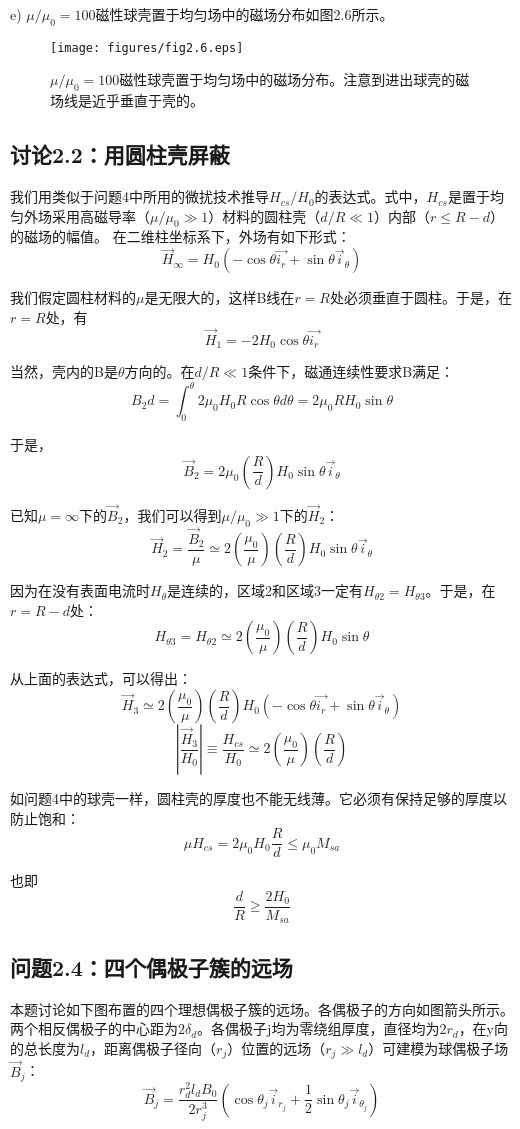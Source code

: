 e) $\mu/\mu_0=100$磁性球壳置于均匀场中的磁场分布如图2.6所示。

\begin{figure}
  \centering
 \texttt{[image: figures/fig2.6.eps]}
  \caption{$\mu/\mu_0=100$磁性球壳置于均匀场中的磁场分布。注意到进出球壳的磁场线是近乎垂直于壳的。}
\end{figure}

\subsection{讨论2.2：用圆柱壳屏蔽}
我们用类似于问题4中所用的微扰技术推导$H_{cs}/H_0$的表达式。式中，$H_{cs}$是置于均匀外场采用高磁导率（$\mu/\mu_0 \gg 1$）材料的圆柱壳（$d/R\ll 1$）内部（$r\le R-d$）的磁场的幅值。
在二维柱坐标系下，外场有如下形式：
$$
\vec{H}_\infty =H_0 (-\cos\theta \vec{i_r}+\sin\theta\vec{i}_\theta)
$$

我们假定圆柱材料的$\mu$是无限大的，这样B线在$r=R$处必须垂直于圆柱。于是，在$r=R$处，有
$$\vec{H}_1 =-2 H_0 \cos\theta \vec{i_r}$$

当然，壳内的B是$\theta$方向的。在$d/R\ll 1$条件下，磁通连续性要求B满足：
$$B_2 d=\int_{0}^{\theta}2\mu_0 H_0 R\cos\theta d\theta=2\mu_0 R H_0 \sin\theta$$

于是，
$$\vec{B}_2=2\mu_0 (\frac{R}{d})H_0 \sin\theta \vec{i}_\theta$$

已知$\mu=\infty$下的$\vec{B}_2$，我们可以得到$\mu/\mu_0 \gg 1$下的$\vec{H}_2$：
$$\vec{H}_2= \frac{\vec{B}_2}{\mu}\simeq 2(\frac{\mu_0}{\mu}) (\frac{R}{d})H_0 \sin\theta \vec{i}_\theta$$

因为在没有表面电流时$H_\theta$是连续的，区域2和区域3一定有$H_{\theta 2}=H_{\theta 3}$。于是，在$r=R-d$处：
$$H_{\theta 3}=H_{\theta 2}\simeq 2(\frac{\mu_0}{\mu}) (\frac{R}{d})H_0 \sin\theta$$

从上面的表达式，可以得出：
$$\vec{H}_3 \simeq 2(\frac{\mu_0}{\mu}) (\frac{R}{d})H_0 (-\cos\theta \vec{i_r}+\sin\theta\vec{i}_\theta)$$
$$\left|\frac{\vec{H}_3}{H_0}\right|\equiv\frac{H_{cs}}{H_0}\simeq 2(\frac{\mu_0}{\mu}) (\frac{R}{d})$$

如问题4中的球壳一样，圆柱壳的厚度也不能无线薄。它必须有保持足够的厚度以防止饱和：
$$\mu H_{cs}=2\mu_0 H_0 \frac{R}{d}\le \mu_0 M_{sa}$$

也即
$$\frac{d}{R}\ge \frac{2H_0}{M_{sa}}$$


\subsection{问题2.4：四个偶极子簇的远场}
本题讨论如下图布置的四个理想偶极子簇的远场。各偶极子的方向如图箭头所示。两个相反偶极子的中心距为$2\delta_d$。各偶极子j均为零绕组厚度，直径均为$2r_d$，在y向的总长度为$l_d$，距离偶极子径向（$r_j$）位置的远场（$r_j \gg l_d$）可建模为球偶极子场$\vec{B}_j$：
$$\vec{B}_j=\frac{r_d^2 l_d B_0}{2r_j^3}(\cos\theta_j \vec{i}_{r_j}+\frac{1}{2} \sin\theta_j \vec{i}_{\theta_j})$$

